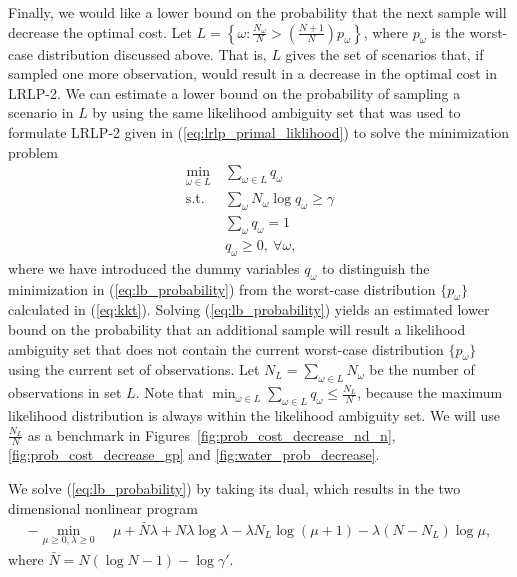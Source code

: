 \documentclass[11pt]{article}
\begin{document}
Finally, we would like a lower bound on the probability that the next sample will decrease the optimal cost.
Let $L = \left\{ \omega : \frac{N_{\omega}}{N} > \left( \frac{N+1}{N} \right) p_\omega \right\}$, where $p_\omega$ is the worst-case distribution discussed above.
That is, $L$ gives the set of scenarios that, if sampled one more observation, would result in a decrease in the optimal cost in LRLP-2.
We can estimate a lower bound on the probability of sampling a scenario in $L$ by using the same likelihood ambiguity set that was used to formulate LRLP-2 given in (\ref{eq:lrlp_primal_liklihood}) to solve the minimization problem
\begin{align}
	\min_{\omega \in L} \ & \sum_{\omega \in L} q_\omega \nonumber \\
	\mbox{s.t.} & \sum_\omega N_\omega \log q_\omega \geq \gamma \label{eq:lb_probability} \\
	& \sum_\omega q_\omega = 1 \nonumber \\
	& q_\omega \geq 0, \ \forall \omega, \nonumber
\end{align}
where we have introduced the dummy variables $q_\omega$ to distinguish the minimization in (\ref{eq:lb_probability}) from the worst-case distribution $\{p_\omega\}$ calculated in (\ref{eq:kkt}). 
Solving (\ref{eq:lb_probability}) yields an estimated lower bound on the probability that an additional sample will result a likelihood ambiguity set that does not contain the current worst-case distribution $\{p_\omega\}$ using the current set of observations. 
Let $N_L = \sum_{\omega \in L} N_\omega$ be the number of observations in set $L$. Note that $\min_{\omega \in L} \sum_{\omega \in L} q_\omega \leq \frac{N_L}{N}$, because the maximum likelihood distribution is always within the likelihood ambiguity set. We will use $\frac{N_L}{N}$ as a benchmark in Figures~\ref{fig:prob_cost_decrease_nd_n}, \ref{fig:prob_cost_decrease_gp} and \ref{fig:water_prob_decrease}. 

We solve (\ref{eq:lb_probability}) by taking its dual, which results in the two dimensional nonlinear program
\begin{align}
	-\min_{\mu \geq 0,\lambda \geq 0} \ & \mu + \bar{N}\lambda + N\lambda\log\lambda - \lambda N_L \log(\mu + 1) - \lambda (N-N_L) \log\mu, \label{eq:prob_cost_decrease}
\end{align}
where $\bar{N} = N(\log N - 1) - \log\gamma'$.
\end{document}
